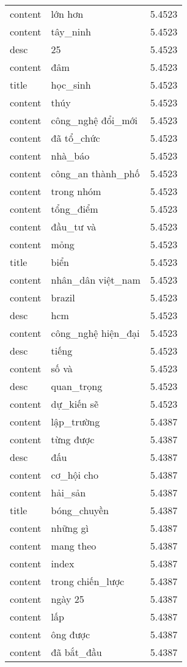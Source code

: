 \documentclass{article}
\begin{document}
\begin{tabular}{lll}
content & lớn hơn & 5.4523\\
content & tây\_ninh & 5.4523\\
desc & 25 & 5.4523\\
content & đâm & 5.4523\\
title & học\_sinh & 5.4523\\
content & thúy & 5.4523\\
content & công\_nghệ đổi\_mới & 5.4523\\
content & đã tổ\_chức & 5.4523\\
content & nhà\_báo & 5.4523\\
content & công\_an thành\_phố & 5.4523\\
content & trong nhóm & 5.4523\\
content & tổng\_điểm & 5.4523\\
content & đầu\_tư và & 5.4523\\
content & mỏng & 5.4523\\
title & biển & 5.4523\\
content & nhân\_dân việt\_nam & 5.4523\\
content & brazil & 5.4523\\
desc & hcm & 5.4523\\
content & công\_nghệ hiện\_đại & 5.4523\\
desc & tiếng & 5.4523\\
content & số và & 5.4523\\
desc & quan\_trọng & 5.4523\\
content & dự\_kiến sẽ & 5.4523\\
content & lập\_trường & 5.4387\\
content & từng được & 5.4387\\
desc & đấu & 5.4387\\
content & cơ\_hội cho & 5.4387\\
content & hải\_sản & 5.4387\\
title & bóng\_chuyền & 5.4387\\
content & những gì & 5.4387\\
content & mang theo & 5.4387\\
content & index & 5.4387\\
content & trong chiến\_lược & 5.4387\\
content & ngày 25 & 5.4387\\
content & lấp & 5.4387\\
content & ông được & 5.4387\\
content & đã bắt\_đầu & 5.4387\\

\end{tabular}
\end{document}

